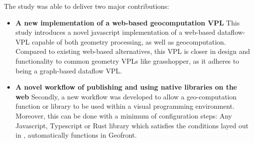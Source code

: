 The study was able to deliver two major contributions:
\begin{itemize}[-]
  \item \textbf{A new implementation of a web-based geocomputation VPL}
    This study introduces a novel javascript implementation of a web-based dataflow-VPL capable of both geometry processing, as well as geocomputation.
    Compared to existing web-based alternatives, this VPL is closer in design and functionality to common geometry VPLs like grasshopper, as it adheres to being a graph-based dataflow VPL. 


  \item \textbf{A novel workflow of publishing and using native libraries on the web}
    Secondly, a new workflow was developed to allow a geo-computation function or library to be used within a visual programming environment.
    Moreover, this can be done with a minimum of configuration steps: 
    Any Javascript, Typescript or Rust library which satisfies the conditions layed out in , automatically functions in Geofront.
    
\end{itemize}

